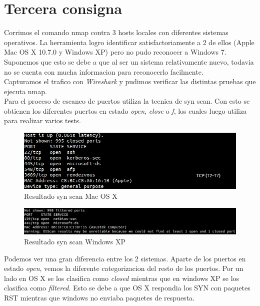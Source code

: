 \documentclass[a4paper]{article}
\begin{document}
\newpage
\section{Tercera consigna}

Corrimos el comando nmap contra 3 hosts locales con diferentes sistemas operativos. La herramienta logro identificar satisfactoriamente a 2 de ellos (Apple Mac OS X 10.7.0 y Windows XP) pero no pudo reconocer a Windows 7. Suponemos que esto se debe a que al ser un sistema relativamente nuevo, todavia no se cuenta con mucha informacion para reconocerlo facilmente. \\


Capturamos el trafico con \textit{Wireshark} y pudimos verificar las distintas pruebas que ejecuta nmap.\\

Para el proceso de escaneo de puertos utiliza la tecnica de syn scan. Con esto se obtienen los diferentes puertos en estado \textit{open}, \textit{close} o \textit{f}, los cuales luego utiliza para realizar varios tests.


\begin{figure}[H]
  \centering
  \includegraphics[scale=0.60]{graficos/macPorts.png}
  \caption{Resultado syn scan Mac OS X}
\end{figure}  

\begin{figure}[H]
  \centering
  \includegraphics[scale=0.60]{graficos/windowsPorts.png}
  \caption{Resultado syn scan Windows XP}
\end{figure}

Podemos ver una gran diferencia entre los 2 sistemas. Aparte de los puertos en estado \textit{open}, vemos la diferente categorizacion del resto de los puertos. Por un lado en OS X se los clasifica como \textit{closed} mientras que en windows XP se los clasifica como \textit{filtered}. Esto se debe a que OS X respondia los SYN con paquetes RST mientras que windows no enviaba paquetes de respuesta. 
  
\end{document}
